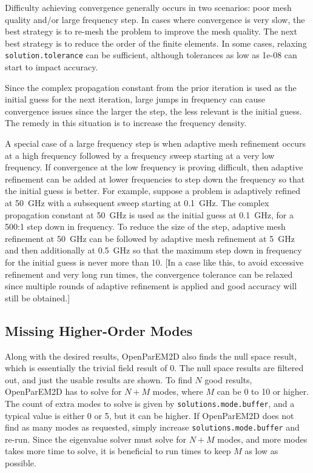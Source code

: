 \documentclass[titlepage]{article}
\renewcommand\_{\textunderscore\linebreak[1]}
\begin{document}
Difficulty achieving convergence generally occurs in two scenarios: poor mesh quality and/or large frequency step.  In cases where convergence is very slow, the best strategy is to re-mesh the problem to improve the mesh quality.  The next best strategy is to reduce the order of the finite elements.  In some cases, relaxing \texttt{solution.tolerance} can be sufficient, although tolerances as low as 1e-08 can start to impact accuracy.

Since the complex propagation constant from the prior iteration is used as the initial guess for the next iteration, large jumps in frequency can cause convergence issues since the larger the step, the less relevant is the initial guess.  The remedy in this situation is to increase the frequency density.

A special case of a large frequency step is when adaptive mesh refinement occurs at a high frequency followed by a frequency sweep starting at a very low frequency.  If convergence at the low frequency is proving difficult, then adaptive refinement can be added at lower frequencies to step down the frequency so that the initial guess is better.  For example, suppose a problem is adaptively refined at 50~GHz with a subsequent sweep starting at 0.1~GHz.  The complex propagation constant at 50~GHz is used as the initial guess at 0.1~GHz, for a 500:1 step down in frequency.  To reduce the size of the step, adaptive mesh refinement at 50~GHz can be followed by adaptive mesh refinement at 5~GHz and then additionally at 0.5~GHz so that the maximum step down in frequency for the initial guess is never more than 10.  [In a case like this, to avoid excessive refinement and very long run times, the convergence tolerance can be relaxed since multiple rounds of adaptive refinement is applied and good accuracy will still be obtained.]

\subsection{Missing Higher-Order Modes}

Along with the desired results, OpenParEM2D also finds the null space result, which is essentially the trivial field result of 0.  The null space results are filtered out, and just the usable results are shown.  To find $N$ good results, OpenParEM2D has to solve for $N+M$ modes, where $M$ can be 0 to 10 or higher.  The count of extra modes to solve is given by \texttt{solutions.mode.buffer}, and a typical value is either 0 or 5, but it can be higher.  If OpenParEM2D does not find as many modes as requested, simply increase \texttt{solutions.mode.buffer} and re-run.  Since the eigenvalue solver must solve for $N+M$ modes, and more modes takes more time to solve, it is beneficial to run times to keep $M$ as low as possible.
\end{document}
